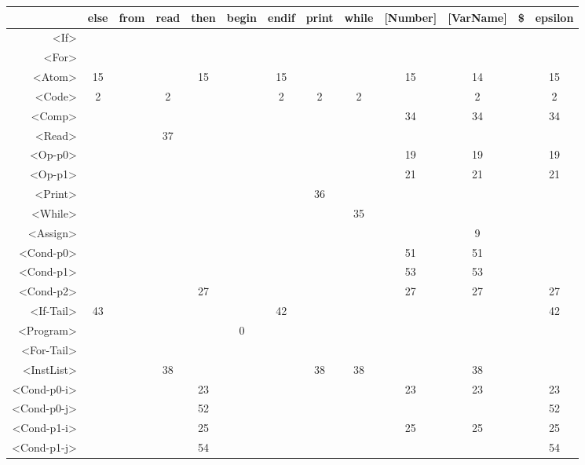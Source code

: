 \begin{tabular}{r|c@{ }c@{ }c@{ }c@{ }c@{ }c@{ }c@{ }c@{ }c@{ }c@{ }c@{ }c@{ }}
 & else & from & read & then & begin & endif & print & while & [Number] & [VarName] & \$ & epsilon \\\hline
<If> &   &   &   &   &   &   &   &   &   &   &   &   \\\hline
<For> &   &   &   &   &   &   &   &   &   &   &   &   \\\hline
<Atom> & 15 &   &   & 15 &   & 15 &   &   & 15 & 14 &   & 15 \\\hline
<Code> & 2 &   & 2 &   &   & 2 & 2 & 2 &   & 2 &   & 2 \\\hline
<Comp> &   &   &   &   &   &   &   &   & 34 & 34 &   & 34 \\\hline
<Read> &   &   & 37 &   &   &   &   &   &   &   &   &   \\\hline
<Op-p0> &   &   &   &   &   &   &   &   & 19 & 19 &   & 19 \\\hline
<Op-p1> &   &   &   &   &   &   &   &   & 21 & 21 &   & 21 \\\hline
<Print> &   &   &   &   &   &   & 36 &   &   &   &   &   \\\hline
<While> &   &   &   &   &   &   &   & 35 &   &   &   &   \\\hline
<Assign> &   &   &   &   &   &   &   &   &   & 9 &   &   \\\hline
<Cond-p0> &   &   &   &   &   &   &   &   & 51 & 51 &   &   \\\hline
<Cond-p1> &   &   &   &   &   &   &   &   & 53 & 53 &   &   \\\hline
<Cond-p2> &   &   &   & 27 &   &   &   &   & 27 & 27 &   & 27 \\\hline
<If-Tail> & 43 &   &   &   &   & 42 &   &   &   &   &   & 42 \\\hline
<Program> &   &   &   &   & 0 &   &   &   &   &   &   &   \\\hline
<For-Tail> &   &   &   &   &   &   &   &   &   &   &   &   \\\hline
<InstList> &   &   & 38 &   &   &   & 38 & 38 &   & 38 &   &   \\\hline
<Cond-p0-i> &   &   &   & 23 &   &   &   &   & 23 & 23 &   & 23 \\\hline
<Cond-p0-j> &   &   &   & 52 &   &   &   &   &   &   &   & 52 \\\hline
<Cond-p1-i> &   &   &   & 25 &   &   &   &   & 25 & 25 &   & 25 \\\hline
<Cond-p1-j> &   &   &   & 54 &   &   &   &   &   &   &   & 54 \\\hline

\end{tabular}
